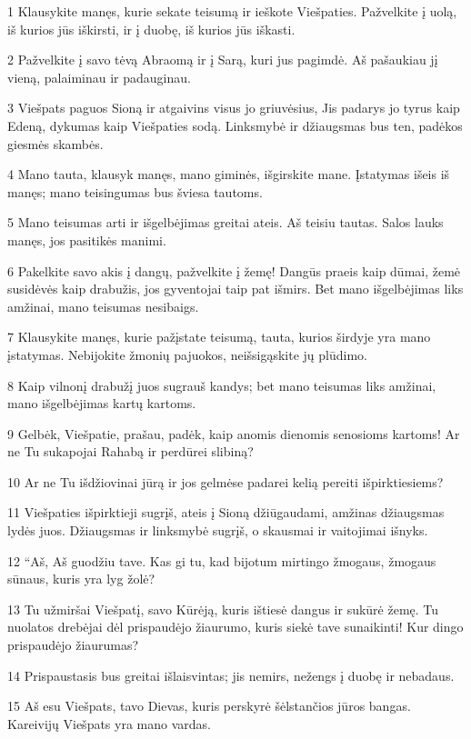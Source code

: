 \par 1 Klausykite manęs, kurie sekate teisumą ir ieškote Viešpaties. Pažvelkite į uolą, iš kurios jūs iškirsti, ir į duobę, iš kurios jūs iškasti. 
\par 2 Pažvelkite į savo tėvą Abraomą ir į Sarą, kuri jus pagimdė. Aš pašaukiau jį vieną, palaiminau ir padauginau. 
\par 3 Viešpats paguos Sioną ir atgaivins visus jo griuvėsius, Jis padarys jo tyrus kaip Edeną, dykumas kaip Viešpaties sodą. Linksmybė ir džiaugsmas bus ten, padėkos giesmės skambės. 
\par 4 Mano tauta, klausyk manęs, mano giminės, išgirskite mane. Įstatymas išeis iš manęs; mano teisingumas bus šviesa tautoms. 
\par 5 Mano teisumas arti ir išgelbėjimas greitai ateis. Aš teisiu tautas. Salos lauks manęs, jos pasitikės manimi. 
\par 6 Pakelkite savo akis į dangų, pažvelkite į žemę! Dangūs praeis kaip dūmai, žemė susidėvės kaip drabužis, jos gyventojai taip pat išmirs. Bet mano išgelbėjimas liks amžinai, mano teisumas nesibaigs. 
\par 7 Klausykite manęs, kurie pažįstate teisumą, tauta, kurios širdyje yra mano įstatymas. Nebijokite žmonių pajuokos, neišsigąskite jų plūdimo. 
\par 8 Kaip vilnonį drabužį juos sugrauš kandys; bet mano teisumas liks amžinai, mano išgelbėjimas­ kartų kartoms. 
\par 9 Gelbėk, Viešpatie, prašau, padėk, kaip anomis dienomis senosioms kartoms! Ar ne Tu sukapojai Rahabą ir perdūrei slibiną? 
\par 10 Ar ne Tu išdžiovinai jūrą ir jos gelmėse padarei kelią pereiti išpirktiesiems? 
\par 11 Viešpaties išpirktieji sugrįš, ateis į Sioną džiūgaudami, amžinas džiaugsmas lydės juos. Džiaugsmas ir linksmybė sugrįš, o skausmai ir vaitojimai išnyks. 
\par 12 “Aš, Aš guodžiu tave. Kas gi tu, kad bijotum mirtingo žmogaus, žmogaus sūnaus, kuris yra lyg žolė? 
\par 13 Tu užmiršai Viešpatį, savo Kūrėją, kuris ištiesė dangus ir sukūrė žemę. Tu nuolatos drebėjai dėl prispaudėjo žiaurumo, kuris siekė tave sunaikinti! Kur dingo prispaudėjo žiaurumas? 
\par 14 Prispaustasis bus greitai išlaisvintas; jis nemirs, nežengs į duobę ir nebadaus. 
\par 15 Aš esu Viešpats, tavo Dievas, kuris perskyrė šėlstančios jūros bangas. Kareivijų Viešpats yra mano vardas. 
